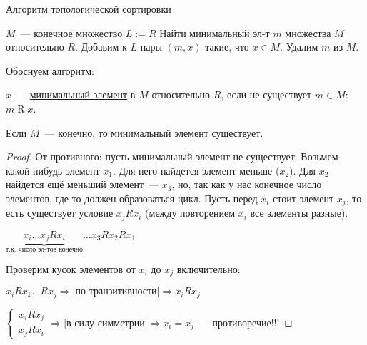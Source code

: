 \documentclass[russian]{lecture-notes}
\theoremstyle{definition}
\newcommand{\relation}[2]{$#1\mathrel{R}#2$}
\begin{document}
\begin{algorithm}[H]
	\caption{Алгоритм топологической сортировки}\label{alg:topsort}
	\begin{algorithmic}[1]
		\State $M$~--- конечное множество
		\State $L:=R$
		\Statex
		\State Найти минимальный эл-т $m$ множества $M$ относительно $R$.
		\State Добавим к $L$ пары $(m,x)$ такие, что $x \in M$.
		\State Удалим $m$ из $M$.
		\EndWhile
	\end{algorithmic}
\end{algorithm}

Обоснуем алгоритм:

\begin{definition}
	\label{opr:min}
	$x$~--- \underline{минимальный элемент} в $M$ относительно $R$, если не существует $m \in M$: \relation{m}{x}.
\end{definition}

\begin{lemma}
	\label{lem:min}
	Если $M$~--- конечно, то минимальный элемент существует.
\end{lemma}

\begin{proof}
	\label{proof:min}
	От противного: пусть минимальный элемент не существует. Возьмем какой-нибудь элемент $x_1$. Для него найдется элемент меньше ($x_2$). Для $x_2$ найдется ещё меньший элемент~--- $x_3$, но, так как у нас конечное число элементов, где-то должен образоваться цикл. Пусть перед $x_i$ стоит элемент $x_j$, то есть существует условие $x_jRx_i$ (между повторением $x_i$ все элементы разные).
	\begin{center}
		$\underbrace{x_i \dots x_jRx_i}_{\text{т.к. число эл-тов конечно}} \dots x_3Rx_2Rx_1$
	\end{center}
	Проверим кусок элементов от $x_i$ до $x_j$ включительно:
	\begin{center}
		$x_iRx_k \dots Rx_j \Rightarrow \text{[по транзитивности]} \Rightarrow x_iRx_j$
	\end{center}
	$\begin{cases}
		x_iRx_j
		\\
		x_jRx_i
	\end{cases} \Rightarrow \text{[в силу симметрии]} \Rightarrow x_i=x_j$~--- противоречие!!!
	
\end{proof}

\begin{example}
\end{example}
\end{document}
